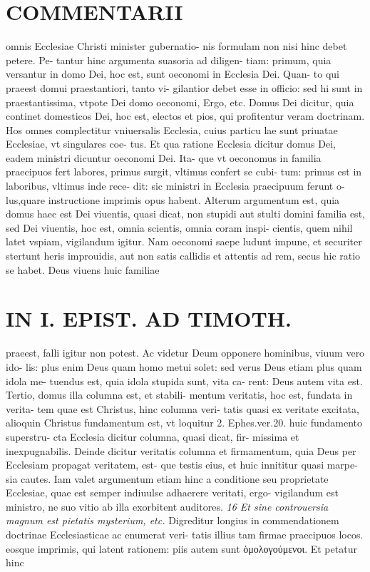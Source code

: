 \documentclass{article}
\begin{document}
\begin{pages}
\section*{COMMENTARII }\pstart omnis Ecclesiae Christi minister gubernatio- nis formulam non nisi hinc debet petere. Pe- tantur hinc argumenta suasoria ad diligen- tiam: primum, quia versantur in domo Dei, hoc est, sunt oeconomi in Ecclesia Dei. Quan- to qui praeest domui praestantiori, tanto vi- gilantior debet esse in officio: sed hi sunt in praestantissima, vtpote Dei domo oeconomi, Ergo, etc. Domus Dei dicitur, quia continet domesticos Dei, hoc est, electos et pios, qui profitentur veram doctrinam. Hos omnes complectitur vniuersalis Ecclesia, cuius particu lae sunt priuatae Ecclesiae, vt singulares coe- tus. Et qua ratione Ecclesia dicitur domus Dei, eadem ministri dicuntur oeconomi Dei. Ita- que vt oeconomus in familia praecipuos fert labores, primus surgit, vltimus confert se cubi- tum: primus est in laboribus, vltimus inde rece- dit: sic ministri in Ecclesia praecipuum ferunt o- lus,quare instructione imprimis opus habent.  \pend\pstart Alterum argumentum est, quia domus haec est Dei viuentis, quasi dicat, non stupidi aut stulti domini familia est, sed Dei viuentis, hoc est, omnia scientis, omnia coram inspi- cientis, quem nihil latet vspiam, vigilandum igitur. Nam oeconomi saepe ludunt impune, et securiter stertunt heris improuidis, aut non satis callidis et attentis ad rem, secus hic ratio se habet. Deus viuens huic familiae  \pend
\section*{IN I. EPIST. AD TIMOTH. }
\marginpar{[ p.79 ]}\pstart praeest, falli igitur non potest. Ac videtur Deum opponere hominibus, viuum vero ido- lis: plus enim Deus quam homo metui solet: sed verus Deus etiam plus quam idola me- tuendus est, quia idola stupida sunt, vita ca- rent: Deus autem vita est.  \pend\pstart Tertio, domus illa columna est, et stabili- mentum veritatis, hoc est, fundata in verita- tem quae est Christus, hinc columna veri- tatis quasi ex veritate excitata, alioquin Christus fundamentum est, vt loquitur 2. Ephes.ver.20. huic fundamento superstru- cta Ecclesia dicitur columna, quasi dicat, fir- missima et inexpugnabilis. Deinde dicitur veritatis columna et firmamentum, quia Deus per Ecclesiam propagat veritatem, est- que testis eius, et huic innititur quasi marpe- sia cautes. Iam valet argumentum etiam hinc a conditione seu proprietate Ecclesiae, quae est semper indiuulse adhaerere veritati, ergo- vigilandum est ministro, ne suo vitio ab illa exorbitent auditores.  \pend
\textit{16 Et sine controuersia magnum est pietatis mysterium, etc. }\pstart Digreditur longius in commendationem doctrinae Ecclesiasticae ac enumerat veri- tatis illius tam firmae praecipuos locos. eosque imprimis, qui latent rationem: piis autem sunt ὁμολογούμενοι. Et petatur hinc  \pend
\marginpar{[ p.80 ]}

\end{pages}
\end{document}
